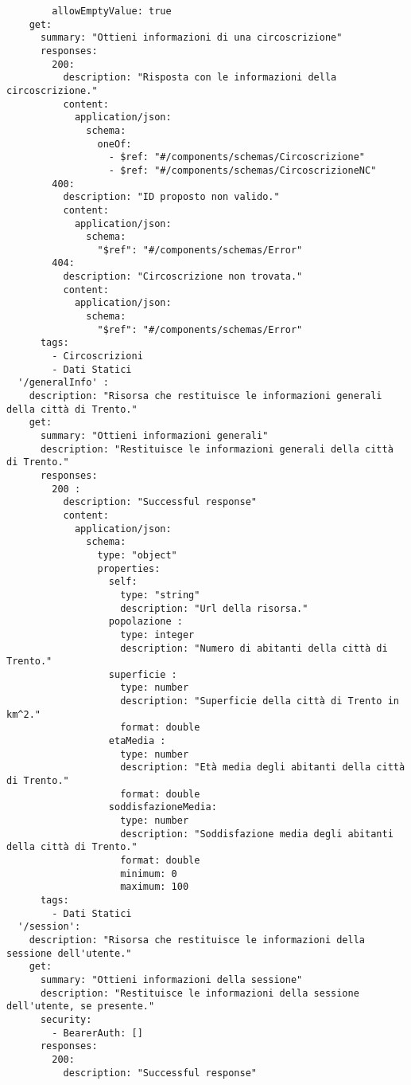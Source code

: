 \begin{verbatim}
        allowEmptyValue: true
    get: 
      summary: "Ottieni informazioni di una circoscrizione"
      responses: 
        200:
          description: "Risposta con le informazioni della circoscrizione."
          content:
            application/json: 
              schema: 
                oneOf:
                  - $ref: "#/components/schemas/Circoscrizione"
                  - $ref: "#/components/schemas/CircoscrizioneNC"
        400:
          description: "ID proposto non valido."
          content:
            application/json:
              schema:
                "$ref": "#/components/schemas/Error"
        404: 
          description: "Circoscrizione non trovata."
          content: 
            application/json: 
              schema: 
                "$ref": "#/components/schemas/Error"
      tags:
        - Circoscrizioni
        - Dati Statici
  '/generalInfo' :
    description: "Risorsa che restituisce le informazioni generali della città di Trento."
    get: 
      summary: "Ottieni informazioni generali"
      description: "Restituisce le informazioni generali della città di Trento."
      responses: 
        200 : 
          description: "Successful response"
          content: 
            application/json:
              schema: 
                type: "object"
                properties: 
                  self:
                    type: "string"
                    description: "Url della risorsa."
                  popolazione :
                    type: integer
                    description: "Numero di abitanti della città di Trento."
                  superficie :
                    type: number
                    description: "Superficie della città di Trento in km^2."
                    format: double
                  etaMedia :
                    type: number
                    description: "Età media degli abitanti della città di Trento."
                    format: double
                  soddisfazioneMedia: 
                    type: number
                    description: "Soddisfazione media degli abitanti della città di Trento."
                    format: double
                    minimum: 0
                    maximum: 100
      tags:
        - Dati Statici
  '/session':
    description: "Risorsa che restituisce le informazioni della sessione dell'utente."
    get:
      summary: "Ottieni informazioni della sessione"
      description: "Restituisce le informazioni della sessione dell'utente, se presente."
      security:
        - BearerAuth: []
      responses:
        200:
          description: "Successful response"

\end{verbatim}
